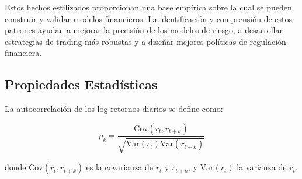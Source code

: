 \documentclass[a4paper,12pt]{report}
\begin{document}
Estos hechos estilizados proporcionan una base empírica sobre la cual se pueden construir y validar modelos financieros. La identificación 
y comprensión de estos patrones ayudan a mejorar la precisión de los modelos de riesgo, a desarrollar estrategias de trading más robustas 
y a diseñar mejores políticas de regulación financiera.


\subsection{Propiedades Estadísticas}

La autocorrelación de los log-retornos diarios se define como:

\[
\rho_k = \frac{\text{Cov}(r_t, r_{t+k})}{\sqrt{\text{Var}(r_t) \text{Var}(r_{t+k})}}
\]

donde $\text{Cov}(r_t, r_{t+k})$ es la covarianza de $r_t$ y $r_{t+k}$, y $\text{Var}(r_t)$ la varianza de $r_t$.






\end{document}
